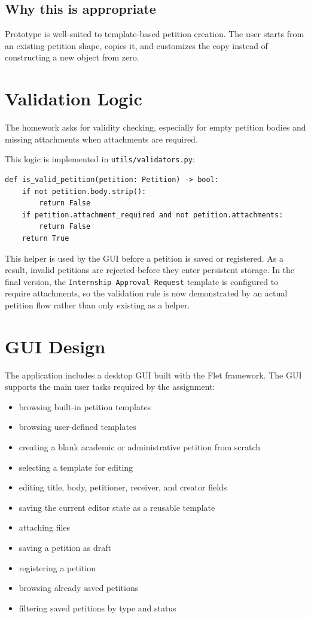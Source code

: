 \documentclass[11pt,a4paper]{article}
\begin{document}
\subsection{Why this is appropriate}

Prototype is well-suited to template-based petition creation. The user starts
from an existing petition shape, copies it, and customizes the copy instead of
constructing a new object from zero.

\section{Validation Logic}

The homework asks for validity checking, especially for empty petition bodies
and missing attachments when attachments are required.

This logic is implemented in \texttt{utils/validators.py}:

\begin{lstlisting}[style=pythonstyle,caption={Petition validity rules}]
def is_valid_petition(petition: Petition) -> bool:
    if not petition.body.strip():
        return False
    if petition.attachment_required and not petition.attachments:
        return False
    return True
\end{lstlisting}

This helper is used by the GUI before a petition is saved or registered. As a
result, invalid petitions are rejected before they enter persistent storage. In
the final version, the \texttt{Internship Approval Request} template is
configured to require attachments, so the validation rule is now demonstrated by
an actual petition flow rather than only existing as a helper.

\section{GUI Design}

The application includes a desktop GUI built with the Flet framework. The GUI
supports the main user tasks required by the assignment:
\begin{itemize}[leftmargin=1.5em]
    \item browsing built-in petition templates
    \item browsing user-defined templates
    \item creating a blank academic or administrative petition from scratch
    \item selecting a template for editing
    \item editing title, body, petitioner, receiver, and creator fields
    \item saving the current editor state as a reusable template
    \item attaching files
    \item saving a petition as draft
    \item registering a petition
    \item browsing already saved petitions
    \item filtering saved petitions by type and status
\end{itemize}
\end{document}
